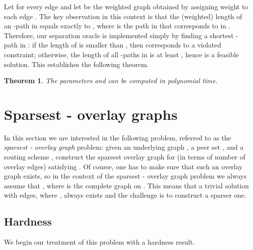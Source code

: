 \LongVersion \documentclass[11pt]{article}
\newtheorem{theorem}{Theorem}[section]
\theoremstyle{definition}
\theoremstyle{plain}
\begin{document}
Let  for every edge  and
let  be the weighted graph obtained by assigning weight  to each
edge .
The key observation in this context is that the (weighted) length of an
-path  in  equals exactly to , where  is the path in  that corresponds to  in
.
Therefore, our separation oracle is implemented simply by finding a shortest
-path  in :
if the length of  is smaller than , then  corresponds to a
violated constraint;
otherwise, the length of all -paths in  is at least , hence
 is a feasible solution.
This establishes the following theorem.

\begin{theorem} \label{theorem:EfficientFDC}
The parameters  and  can be
computed in polynomial time.
\end{theorem}

\section{Sparsest - overlay graphs}
\label{section:SparseOverlayGraphs}


In this section we are interested in the following problem, referred to as the
\emph{sparsest - overlay graph} problem:
given an underlying graph , a peer set , and
a routing scheme ,
construct the sparsest overlay graph  for 
(in terms of number of overlay edges) satisfying .
Of course, one has to make sure that such an overlay graph  exists, so in
the context of the sparsest - overlay graph problem we always assume
that , where  is the complete graph
on .
This means that a trivial solution with  edges, where , always exists and the challenge is to construct a sparser one.

\subsection{Hardness}


We begin our treatment of this problem with a hardness result.
\end{document}
